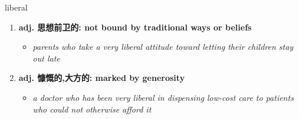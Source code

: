 
\begin{frame}
{\huge liberal}
\begin{center}
\begin{enumerate}\Large
  \item \textbf{adj. 思想前卫的: not bound by traditional ways or beliefs}
  \begin{itemize}
    \item \em{\Large{parents who take a very liberal attitude toward letting their children stay out late}}
  \end{itemize}
  \item \textbf{adj. 慷慨的,大方的: marked by generosity}
  \begin{itemize}
    \item \em{\Large{a doctor who has been very liberal in dispensing low-cost care to patients who could not otherwise afford it}}
  \end{itemize}
\end{enumerate}
\end{center}
\end{frame}
